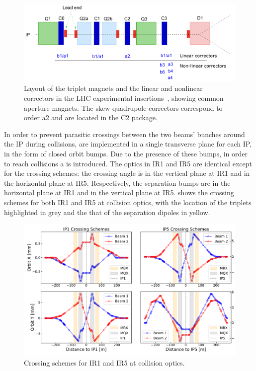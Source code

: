 \begin{figure}[!hbt]
  \centering
  \includegraphics*[width=0.92\linewidth]{Figures/Optics_Measurements_Corrections_at_LHC/corrector_package.png}
  \caption{Layout of the triplet magnets and the linear and nonlinear correctors in the LHC experimental insertions~\cite{CERN:Bruning:Dynap_Studies}, showing common aperture magnets. The skew quadrupole correctors correspond to order a\num{2} and are located in the C\num{2} package.}
  \label{figure:lhc_ir_corrector_layout}
\end{figure}

In order to prevent parasitic crossings between the two beams' bunches around the IP during collisions,  are implemented in a single transverse plane for each IP, in the form of closed orbit bumps.
Due to the presence of these bumps, in order to reach collisions a  is introduced.
The optics in IR\num{1} and IR\num{5} are identical except for the crossing schemes: the crossing angle is in the vertical plane at IR\num{1} and in the horizontal plane at IR\num{5}.
Respectively, the separation bumps are in the horizontal plane at IR\num{1} and in the vertical plane at IR\num{5}.
 shows the crossing schemes for both IR\num{1} and IR\num{5} at collision optics, with the location of the triplets highlighted in grey and the that of the separation dipoles in yellow.

\begin{figure}[!hbt]
  \centering
  \includegraphics*[width=0.99\linewidth]{Figures/Optics_Measurements_Corrections_at_LHC/lhc_crossing_schemes_ip15.pdf}
  \caption{Crossing schemes for IR\num{1} and IR\num{5} at collision optics.}
  \label{figure:lhc_crossing_schemes_ip15}
\end{figure}

